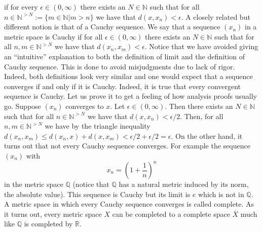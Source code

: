 \documentclass{article}
\begin{document}
if for every $\epsilon\in (0,\infty)$ there exists an $N\in\mathbb{N}$ such that for all $n\in\mathbb{N}^{>N}:=\{m\in\mathbb{N}|m>n\}$ we have that $d(x,x_n)<\epsilon$. A closely related but different notion is that of a Cauchy sequence. We say that a sequence $(x_n)$ in a metric space is Cauchy if for all $\epsilon\in (0,\infty)$ there exists an $N\in\mathbb{N}$ such that for all $n,m\in\mathbb{N}^{>N}$ we have that $d(x_n,x_m)<\epsilon$. Notice that we have avoided giving an ``intuitive'' explanation to both the definition of limit and the definition of Cauchy sequence. This is done to avoid misjudgments due to lack of rigor. Indeed, both definitions look very similar and one would expect that a sequence converges if and only if it is Cauchy. Indeed, it is true that every convergent sequence is Cauchy. Let us prove it to get a feeling of how analysis proofs usually go. Suppose $(x_n)$ converges to $x$. Let $\epsilon\in (0,\infty)$. Then there exists an $N\in\mathbb{N}$ such that for all $n\in\mathbb{N}^{>N}$ we have that $d(x,x_n)<\epsilon/2$. Then, for all $n,m\in\mathbb{N}^{>N}$ we have by the triangle inequality $d(x_n,x_m)\leq d(x_n,x)+d(x,x_m)<\epsilon/2+\epsilon/2=\epsilon$. On the other hand, it turns out that not every Cauchy sequence converges. For example the sequence $(x_n)$ with
\begin{equation}
x_n=(1+\frac{1}{n})^n
\end{equation}
in the metric space $\mathbb{Q}$ (notice that $\mathbb{Q}$ has a natural metric induced by its norm, the absolute value). This sequence is Cauchy but its limit is $e$ which is not in $\mathbb{Q}$. A metric space in which every Cauchy sequence converges is called complete. As it turns out, every metric space $X$ can be completed to a complete space $\overline{X}$ much like $\mathbb{Q}$ is completed by $\mathbb{R}$.
\end{document}
